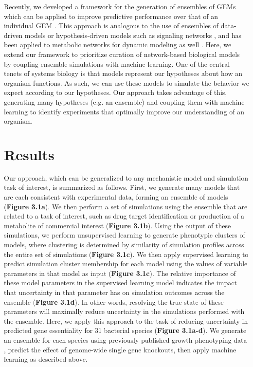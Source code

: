 \documentclass[11pt,twocolumn,notitlepage,openany,twoside]{book}
\begin{document}
\begin{refsection}
Recently, we developed a framework for the generation of ensembles of GEMs which can be applied to improve predictive performance over that of an individual GEM \cite{Biggs2017-md}. This approach is analogous to the use of ensembles of data-driven models \cite{Dietterich2000-dq} or hypothesis-driven models such as signaling networks \cite{Kuepfer2007-gq}, and has been applied to metabolic networks for dynamic modeling as well \cite{Tran2008-pt}. Here, we extend our framework to prioritize curation of network-based biological models by coupling ensemble simulations with machine learning. One of the central tenets of systems biology is that models represent our hypotheses about how an organism functions. As such, we can use these models to simulate the behavior we expect according to our hypotheses. Our approach takes advantage of this, generating many hypotheses (e.g. an ensemble) and coupling them with machine learning to identify experiments that optimally improve our understanding of an organism.

\section{Results}

Our approach, which can be generalized to any mechanistic model and simulation task of interest, is summarized as follows. First, we generate many models that are each consistent with experimental data, forming an ensemble of models (\textbf{Figure 3.1a}). We then perform a set of simulations using the ensemble that are related to a task of interest, such as drug target identification or production of a metabolite of commercial interest (\textbf{Figure 3.1b}). Using the output of these simulations, we perform unsupervised learning to generate phenotypic clusters of models, where clustering is determined by similarity of simulation profiles across the entire set of simulations (\textbf{Figure 3.1c}). We then apply supervised learning to predict simulation cluster membership for each model using the values of variable parameters in that model as input (\textbf{Figure 3.1c}). The relative importance of these model parameters in the supervised learning model indicates the impact that uncertainty in that parameter has on simulation outcomes across the ensemble (\textbf{Figure 3.1d}). In other words, resolving the true state of these parameters will maximally reduce uncertainty in the simulations performed with the ensemble. Here, we apply this approach to the task of reducing uncertainty in predicted gene essentiality for 31 bacterial species (\textbf{Figure 3.1a-d}). We generate an ensemble for each species using previously published growth phenotyping data \cite{Plata2015-bc}, predict the effect of genome-wide single gene knockouts, then apply machine learning as described above.


\end{refsection}
\end{document}
